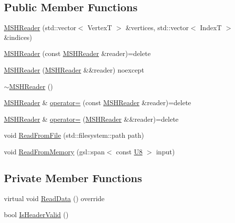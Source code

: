 \subsection*{Public Member Functions}
\begin{DoxyCompactItemize}
\item 
\mbox{\hyperlink{classmage_1_1rendering_1_1loader_1_1_m_s_h_reader_adf50a71f368cd580433b3dab5ea3a1ac}{M\+S\+H\+Reader}} (std\+::vector$<$ VertexT $>$ \&vertices, std\+::vector$<$ IndexT $>$ \&indices)
\item 
\mbox{\hyperlink{classmage_1_1rendering_1_1loader_1_1_m_s_h_reader_ae16a36afbfe65791cdfe8dadd6b57af2}{M\+S\+H\+Reader}} (const \mbox{\hyperlink{classmage_1_1rendering_1_1loader_1_1_m_s_h_reader}{M\+S\+H\+Reader}} \&reader)=delete
\item 
\mbox{\hyperlink{classmage_1_1rendering_1_1loader_1_1_m_s_h_reader_a107ac854c231c1a1c39f30c5199dcec7}{M\+S\+H\+Reader}} (\mbox{\hyperlink{classmage_1_1rendering_1_1loader_1_1_m_s_h_reader}{M\+S\+H\+Reader}} \&\&reader) noexcept
\item 
\mbox{\hyperlink{classmage_1_1rendering_1_1loader_1_1_m_s_h_reader_af45daf383d4e94586b5d2968d5357fce}{$\sim$\+M\+S\+H\+Reader}} ()
\item 
\mbox{\hyperlink{classmage_1_1rendering_1_1loader_1_1_m_s_h_reader}{M\+S\+H\+Reader}} \& \mbox{\hyperlink{classmage_1_1rendering_1_1loader_1_1_m_s_h_reader_a106e5a6cce46777cf7ae36cb4034e1a0}{operator=}} (const \mbox{\hyperlink{classmage_1_1rendering_1_1loader_1_1_m_s_h_reader}{M\+S\+H\+Reader}} \&reader)=delete
\item 
\mbox{\hyperlink{classmage_1_1rendering_1_1loader_1_1_m_s_h_reader}{M\+S\+H\+Reader}} \& \mbox{\hyperlink{classmage_1_1rendering_1_1loader_1_1_m_s_h_reader_a8764164f7e0f78938c5e303d13e0f64d}{operator=}} (\mbox{\hyperlink{classmage_1_1rendering_1_1loader_1_1_m_s_h_reader}{M\+S\+H\+Reader}} \&\&reader)=delete
\item 
void \mbox{\hyperlink{classmage_1_1rendering_1_1loader_1_1_m_s_h_reader_a0308b90e3cf888d383a228cfe8827972}{Read\+From\+File}} (std\+::filesystem\+::path path)
\item 
void \mbox{\hyperlink{classmage_1_1rendering_1_1loader_1_1_m_s_h_reader_afc48490dca5042078726a1ec3fe7abe7}{Read\+From\+Memory}} (gsl\+::span$<$ const \mbox{\hyperlink{namespacemage_afc638980bc6154f15af5e2d93a0e0ea9}{U8}} $>$ input)
\end{DoxyCompactItemize}
\subsection*{Private Member Functions}
\begin{DoxyCompactItemize}
\item 
virtual void \mbox{\hyperlink{classmage_1_1rendering_1_1loader_1_1_m_s_h_reader_a99e8e3c50decb9332dc10bcdf7b6e00a}{Read\+Data}} () override
\item 
bool \mbox{\hyperlink{classmage_1_1rendering_1_1loader_1_1_m_s_h_reader_a7e6948dfb5f5c672719ebe10c4dae6bf}{Is\+Header\+Valid}} ()
\end{DoxyCompactItemize}

